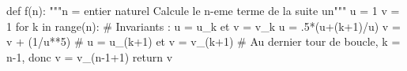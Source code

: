 \question{}
\begin{pyverbatim}
def f(n):
    """n = entier naturel
       Calcule le n-eme terme de la suite un"""
    u = 1
    v = 1
    for k in range(n):
	# Invariants : u = u_k et v = v_k
        u = .5*(u+(k+1)/u)
        v = v + (1/u**5)
        # u = u_(k+1) et v = v_(k+1)
    # Au dernier tour de boucle, k = n-1, donc v = v_(n-1+1)
    return v
\end{pyverbatim}